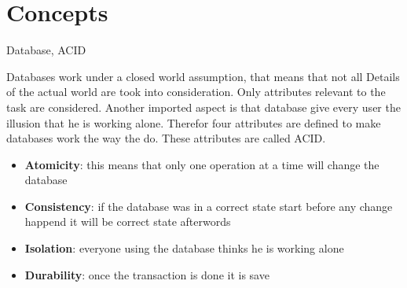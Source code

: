 \section{Concepts}
\begin{keywords}
Database, ACID
\end{keywords}
Databases work under a closed world assumption, that means that not all Details
of the actual world are took into consideration. Only attributes relevant to the
task are considered. Another imported aspect is that database give every user
the illusion that he is working alone. Therefor four attributes are defined to
make databases work the way the do. These attributes are called ACID.
\begin{itemize}
\setlength{\itemsep}{1pt}
	\item \textbf{Atomicity}: this means that only one operation at a time will change
the database
	\item \textbf{Consistency}: if the database was in a correct state start before any change
happend it will be correct state afterwords
	\item \textbf{Isolation}: everyone using the database thinks he is working alone
	\item \textbf{Durability}: once the transaction is done it is save
\end{itemize}
